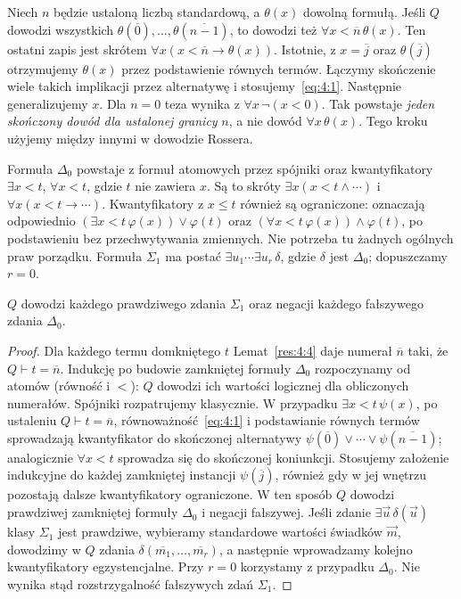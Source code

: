 \begin{uwaga}\label{res:4:5}
Niech $n$ będzie ustaloną liczbą standardową, a $\theta(x)$ dowolną formułą. Jeśli $Q$ dowodzi wszystkich $\theta(\overline0),\ldots,\theta(\overline{n-1})$, to dowodzi też $\forall x<\overline n\,\theta(x)$. Ten ostatni zapis jest skrótem $\forall x(x<\overline n\to\theta(x))$. Istotnie, z $x=\overline j$ oraz $\theta(\overline j)$ otrzymujemy $\theta(x)$ przez podstawienie równych termów. Łączymy skończenie wiele takich implikacji przez alternatywę i stosujemy~\eqref{eq:4:1}. Następnie generalizujemy $x$. Dla $n=0$ teza wynika z $\forall x\,\neg(x<0)$. Tak powstaje \emph{jeden skończony dowód dla ustalonej granicy} $n$, a nie dowód $\forall x\,\theta(x)$. Tego kroku użyjemy między innymi w dowodzie Rossera.
\end{uwaga}

\begin{definicja}\label{res:4:6}
Formuła $\Delta_0$ powstaje z formuł atomowych przez spójniki oraz kwantyfikatory $\exists x<t$, $\forall x<t$, gdzie $t$ nie zawiera $x$. Są to skróty $\exists x(x<t\land\cdots)$ i $\forall x(x<t\to\cdots)$. Kwantyfikatory z $x\le t$ również są ograniczone: oznaczają odpowiednio $(\exists x<t\,\varphi(x))\lor\varphi(t)$ oraz $(\forall x<t\,\varphi(x))\land\varphi(t)$, po podstawieniu bez przechwytywania zmiennych. Nie potrzeba tu żadnych ogólnych praw porządku. Formuła $\Sigma_1$ ma postać $\exists u_1\cdots\exists u_r\,\delta$, gdzie $\delta$ jest $\Delta_0$; dopuszczamy $r=0$.
\end{definicja}

\begin{lemat}\label{res:4:7}
$Q$ dowodzi każdego prawdziwego zdania $\Sigma_1$ oraz negacji każdego fałszywego zdania $\Delta_0$.
\end{lemat}
\begin{proof}
Dla każdego termu domkniętego $t$ Lemat~\ref{res:4:4} daje numerał $\overline n$ taki, że $Q\vdash t=\overline n$. Indukcję po budowie zamkniętej formuły $\Delta_0$ rozpoczynamy od atomów (równość i $<$): $Q$ dowodzi ich wartości logicznej dla obliczonych numerałów. Spójniki rozpatrujemy klasycznie. W przypadku $\exists x<t\,\psi(x)$, po ustaleniu $Q\vdash t=\overline n$, równoważność~\eqref{eq:4:1} i podstawianie równych termów sprowadzają kwantyfikator do skończonej alternatywy $\psi(\overline0)\lor\cdots\lor\psi(\overline{n-1})$; analogicznie $\forall x<t$ sprowadza się do skończonej koniunkcji. Stosujemy założenie indukcyjne do każdej zamkniętej instancji $\psi(\overline j)$, również gdy w jej wnętrzu pozostają dalsze kwantyfikatory ograniczone. W ten sposób $Q$ dowodzi prawdziwej zamkniętej formuły $\Delta_0$ i negacji fałszywej. Jeśli zdanie $\exists\vec u\,\delta(\vec u)$ klasy $\Sigma_1$ jest prawdziwe, wybieramy standardowe wartości świadków $\vec m$, dowodzimy w $Q$ zdania $\delta(\overline{m_1},\ldots,\overline{m_r})$, a następnie wprowadzamy kolejno kwantyfikatory egzystencjalne. Przy $r=0$ korzystamy z przypadku $\Delta_0$. Nie wynika stąd rozstrzygalność fałszywych zdań $\Sigma_1$.
\end{proof}

